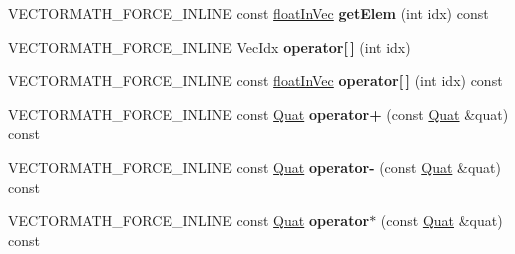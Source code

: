 \begin{DoxyCompactItemize}
\item 
\mbox{\label{classVectormath_1_1Aos_1_1Quat_aef3508f2049f0af59ea540184b5bda25}} 
V\+E\+C\+T\+O\+R\+M\+A\+T\+H\+\_\+\+F\+O\+R\+C\+E\+\_\+\+I\+N\+L\+I\+NE const \hyperlink{classVectormath_1_1floatInVec}{float\+In\+Vec} {\bfseries get\+Elem} (int idx) const
\item 
\mbox{\label{classVectormath_1_1Aos_1_1Quat_a5db86568489c304ce41351d8f4f4533c}} 
V\+E\+C\+T\+O\+R\+M\+A\+T\+H\+\_\+\+F\+O\+R\+C\+E\+\_\+\+I\+N\+L\+I\+NE Vec\+Idx {\bfseries operator\mbox{[}$\,$\mbox{]}} (int idx)
\item 
\mbox{\label{classVectormath_1_1Aos_1_1Quat_a9fdc8b65a955e30c9aa995529233d69e}} 
V\+E\+C\+T\+O\+R\+M\+A\+T\+H\+\_\+\+F\+O\+R\+C\+E\+\_\+\+I\+N\+L\+I\+NE const \hyperlink{classVectormath_1_1floatInVec}{float\+In\+Vec} {\bfseries operator\mbox{[}$\,$\mbox{]}} (int idx) const
\item 
\mbox{\label{classVectormath_1_1Aos_1_1Quat_a32faa5172b2909acebcfbd31f080e9d4}} 
V\+E\+C\+T\+O\+R\+M\+A\+T\+H\+\_\+\+F\+O\+R\+C\+E\+\_\+\+I\+N\+L\+I\+NE const \hyperlink{classVectormath_1_1Aos_1_1Quat}{Quat} {\bfseries operator+} (const \hyperlink{classVectormath_1_1Aos_1_1Quat}{Quat} \&quat) const
\item 
\mbox{\label{classVectormath_1_1Aos_1_1Quat_aff5d738b547e37030d3ba2f6d77099d7}} 
V\+E\+C\+T\+O\+R\+M\+A\+T\+H\+\_\+\+F\+O\+R\+C\+E\+\_\+\+I\+N\+L\+I\+NE const \hyperlink{classVectormath_1_1Aos_1_1Quat}{Quat} {\bfseries operator-\/} (const \hyperlink{classVectormath_1_1Aos_1_1Quat}{Quat} \&quat) const
\item 
\mbox{\label{classVectormath_1_1Aos_1_1Quat_a51d154bfc8c0fb410c6c9bec7cd7bb63}} 
V\+E\+C\+T\+O\+R\+M\+A\+T\+H\+\_\+\+F\+O\+R\+C\+E\+\_\+\+I\+N\+L\+I\+NE const \hyperlink{classVectormath_1_1Aos_1_1Quat}{Quat} {\bfseries operator$\ast$} (const \hyperlink{classVectormath_1_1Aos_1_1Quat}{Quat} \&quat) const
\item 
\mbox{\label{classVectormath_1_1Aos_1_1Quat_af1a8a84ea7f40c6dae314ee81bb93a39}} 

\end{DoxyCompactItemize}
